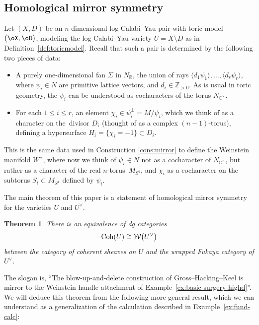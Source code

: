 \documentclass[pdftex]{sigma}%
\numberwithin{equation}{section}
\newtheorem{Theorem}{Theorem}[section]
\def\CC{\mathbb{C}}
\def\RR{\mathbb{R}}
\def\ZZ{\mathbb{Z}}
\def\cW{\mathcal{W}}
\newcommand{\Coh}{\textup{Coh}}
\begin{document}
 \subsection{Homological mirror symmetry}
Let $(X,D)$ be an $n$-dimensional log Calabi--Yau pair with toric model $\big(\oX,\oD\big)$, modeling the log Calabi--Yau variety $U=X\setminus D$ as in Definition~\ref{def:toricmodel}.
Recall that such a pair is determined by the following two pieces of data:
\begin{itemize}\itemsep=0pt
 \item A purely one-dimensional fan $\Sigma$ in $N_\RR$, the union of rays $\langle d_1\psi_1\rangle, \dots, \langle d_r\psi_r \rangle$, where $\psi_i\in N$ are primitive lattice vectors, and $d_i\in \ZZ_{>0}$. As is usual in toric geometry, the $\psi_i$ can be understood as cocharacters of the torus $N_{\CC^\times}$.
 \item For each $1\leq i\leq r$, an element $\chi_i\in \psi_i^\perp= M/\psi_i$, which we think of as a character on the~divisor $D_i$ (thought of as a complex $(n-1)$-torus), defining a hypersurface $H_i=\allowbreak\{\chi_i=-1\}\subset D_i$.
\end{itemize}
This is the same data used in Construction \ref{cons:mirror} to define the Weinstein manifold $W^\vee$, where now we think of $\psi_i\in N$ not as a cocharacter of $N_{\CC^\times}$, but rather as a character of the real $n$-torus~$M_{S^1}$, and $\chi_i$ as a cocharacter on the subtorus $S_i \subset M_{S^1}$ defined by $\psi_i$.

The main theorem of this paper is a statement of homological mirror symmetry for the varieties $U$ and $U^\vee$.

\begin{Theorem}\label{thm:main}
 There is an equivalence of dg categories
 \[
 	\Coh(U)\cong \cW\big(U^\vee\big)
 \]
 between the category of coherent sheaves on $U$ and the wrapped Fukaya category of $U^\vee$.
\end{Theorem}

The slogan is, ``The blow-up-and-delete construction of Gross--Hacking--Keel is mirror to the Weinstein handle attachment of Example~\ref{ex:basic-surgery-highd}''.
We will deduce this theorem from the following more general result, which we can understand as a generalization of the calculation described in Example~\ref{ex:fund-calc}:
\end{document}
